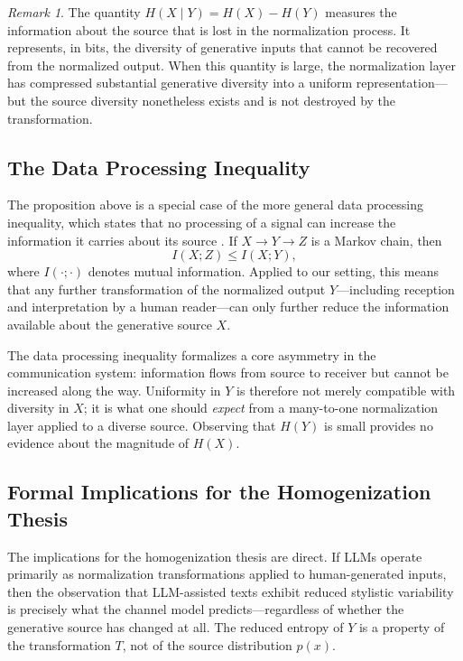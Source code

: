 \documentclass[12pt,a4paper]{article}
\theoremstyle{definition}
\theoremstyle{plain}
\theoremstyle{remark}
\newtheorem{remark}[definition]{Remark}
\begin{document}
\begin{remark}
The quantity $H(X \mid Y) = H(X) - H(Y)$ measures the information about the source that is
lost in the normalization process. It represents, in bits, the diversity of generative inputs
that cannot be recovered from the normalized output. When this quantity is large, the
normalization layer has compressed substantial generative diversity into a uniform
representation---but the source diversity nonetheless exists and is not destroyed by the
transformation.
\end{remark}

\subsection{The Data Processing Inequality}

The proposition above is a special case of the more general data processing inequality, which
states that no processing of a signal can increase the information it carries about its
source \citep{shannon1948}. If $X \to Y \to Z$ is a Markov chain, then
\[
I(X; Z) \leq I(X; Y),
\]
where $I(\cdot ; \cdot)$ denotes mutual information. Applied to our setting, this means that
any further transformation of the normalized output $Y$---including reception and
interpretation by a human reader---can only further reduce the information available about
the generative source $X$.

The data processing inequality formalizes a core asymmetry in the communication system:
information flows from source to receiver but cannot be increased along the way. Uniformity
in $Y$ is therefore not merely compatible with diversity in $X$; it is what one should
\emph{expect} from a many-to-one normalization layer applied to a diverse source. Observing
that $H(Y)$ is small provides no evidence about the magnitude of $H(X)$.

\subsection{Formal Implications for the Homogenization Thesis}

The implications for the homogenization thesis are direct. If LLMs operate primarily as
normalization transformations applied to human-generated inputs, then the observation that
LLM-assisted texts exhibit reduced stylistic variability is precisely what the channel model
predicts---regardless of whether the generative source has changed at all. The reduced entropy
of $Y$ is a property of the transformation $T$, not of the source distribution $p(x)$.
\end{document}
